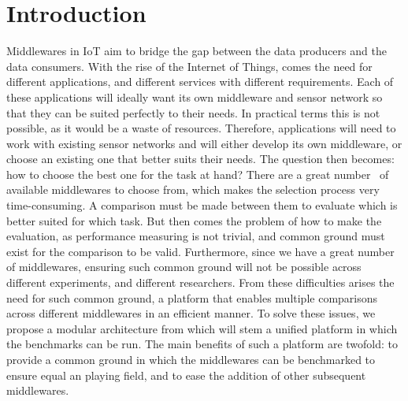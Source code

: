 \documentclass[conference]{IEEEtran}
\begin{document}
\title{}


\author{}


\maketitle

\begin{abstract}
\end{abstract}

\section{Introduction}

Middlewares in IoT aim to bridge the gap between the data producers and the data consumers. With the rise of the Internet of Things, comes the need for different applications, and different services with different requirements. Each of these applications will ideally want its own middleware and sensor network so that they can be suited perfectly to their needs. In practical terms this is not possible, as it would be a waste of resources. Therefore, applications will need to work with existing sensor networks and will either develop its own middleware, or choose an existing one that better suits their needs. The question then becomes: how to choose the best one for the task at hand? There are a great number~\cite{razzaque_middleware_2016} of available middlewares to choose from, which makes the selection process very time-consuming. A comparison must be made between them to evaluate which is better suited for which task. But then comes the problem of how to make the evaluation, as performance measuring is not trivial, and common ground must exist for the comparison to be valid. Furthermore, since we have a great number of middlewares, ensuring such common ground will not be possible across different experiments, and different researchers. From these difficulties arises the need for such common ground, a platform that enables multiple comparisons across different middlewares in an efficient manner. To solve these issues, we propose a modular architecture from which will stem a unified platform in which the benchmarks can be run. The main benefits of such a platform are twofold: to provide a common ground in which the middlewares can be benchmarked to ensure equal an playing field, and to ease the addition of other subsequent middlewares.  
\end{document}
